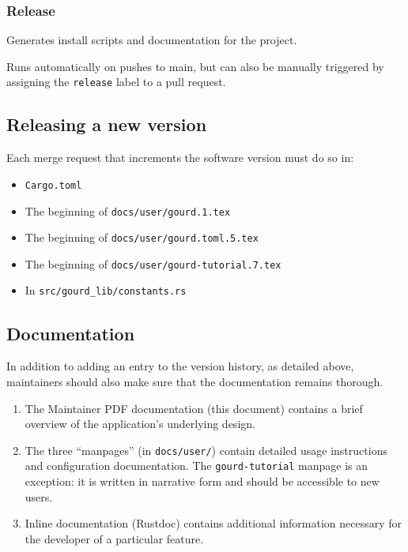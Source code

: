 \subsubsection{Release}
Generates install scripts and documentation for the project.

Runs automatically on pushes to main, but can also be manually triggered by assigning the \texttt{release} label to a pull request.

\subsection{Releasing a new version}

Each merge request that increments the software version must do so in:

\begin{itemize}
  \item \texttt{Cargo.toml}
  \item The beginning of \texttt{docs/user/gourd.1.tex}
  \item The beginning of \texttt{docs/user/gourd.toml.5.tex}
  \item The beginning of \texttt{docs/user/gourd-tutorial.7.tex}
  \item In \texttt{src/gourd\_lib/constants.rs}
\end{itemize}

\subsection{Documentation}

In addition to adding an entry to the version history, as detailed above, maintainers should also make sure that the
documentation remains thorough.
\begin{enumerate}
  \item The Maintainer PDF documentation (this document) contains a brief overview of the application's underlying design.
  \item The three ``manpages'' (in \verb|docs/user/|) contain detailed usage instructions and configuration documentation.
    The \texttt{gourd-tutorial} manpage is an exception: it is written in narrative form and should be accessible to new users.
  \item Inline documentation (Rustdoc) contains additional information necessary for the developer of a particular feature.
\end{enumerate}

